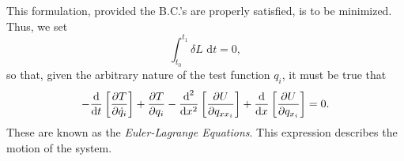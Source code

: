 This formulation, provided the B.C.'s are properly satisfied, is to be minimized. Thus, we set
\begin{equation}
\int_{t_0}^{t_1}\delta L\text{ d}t = 0,
\end{equation}
so that, given the arbitrary nature of the test function $q_i$, it must be true that
\begin{equation}
-\frac{\text d}{\text dt}\left[\frac{\partial T}{\partial \dot q_i}\right]+\frac{\partial T}{\partial q_i} - \frac{\text d^2}{\text dx^2}\left[\frac{\partial U}{\partial q_{xx_i}}\right]+\frac{\text d}{\text dx}\left[\frac{\partial  U}{\partial q_{x_i}}\right] = 0.
\label{eq:euler.lagrange}
\end{equation}
These are known as the \emph{Euler-Lagrange Equations}. This expression describes the motion of the system.

